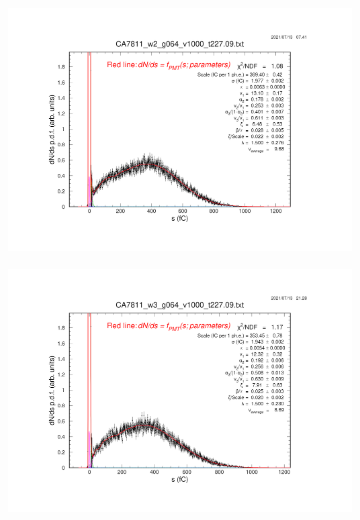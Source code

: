 \begin{figure}[t]
	\centering
	\begin{subfigure}[c]{0.42\linewidth}
		\centering
		\includegraphics[width=\linewidth, trim={6cm 6cm 80mm 85mm},clip]{figures/pavel_temp/CA7811_w2_g064_v1000_3mm.09.png}
		\vspace{0mm}
	\end{subfigure}%
	\begin{subfigure}[c]{0.42\linewidth}
		\centering
		\includegraphics[width=\linewidth, trim={80mm 6cm 6cm 85mm},clip]{figures/pavel_temp/CA7811_w3_g064_v1000_cln.09.png}
		\vspace{0mm}
	\end{subfigure}%
	\vspace{0mm}
	\begin{subfigure}[c]{0.42\linewidth}

\end{subfigure}
\end{figure}
